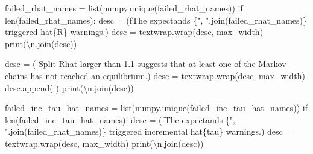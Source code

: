\documentclass[
  letterpaper,
  DIV=11,
  numbers=noendperiod]{scrartcl}
\newenvironment{Shaded}{\begin{snugshade}}{\end{snugshade}}
\newcommand{\BuiltInTok}[1]{\textcolor[rgb]{0.00,0.23,0.31}{#1}}
\newcommand{\CharTok}[1]{\textcolor[rgb]{0.13,0.47,0.30}{#1}}
\newcommand{\ControlFlowTok}[1]{\textcolor[rgb]{0.00,0.23,0.31}{#1}}
\newcommand{\NormalTok}[1]{\textcolor[rgb]{0.00,0.23,0.31}{#1}}
\newcommand{\OperatorTok}[1]{\textcolor[rgb]{0.37,0.37,0.37}{#1}}
\newcommand{\SpecialCharTok}[1]{\textcolor[rgb]{0.37,0.37,0.37}{#1}}
\newcommand{\SpecialStringTok}[1]{\textcolor[rgb]{0.13,0.47,0.30}{#1}}
\newcommand{\StringTok}[1]{\textcolor[rgb]{0.13,0.47,0.30}{#1}}
\begin{document}
\begin{Shaded}
\begin{Highlighting}[]
\NormalTok{  failed\_rhat\_names }\OperatorTok{=} \BuiltInTok{list}\NormalTok{(numpy.unique(failed\_rhat\_names))}
  \ControlFlowTok{if} \BuiltInTok{len}\NormalTok{(failed\_rhat\_names):}
\NormalTok{    desc }\OperatorTok{=}\NormalTok{ (}\SpecialStringTok{f\textquotesingle{}The expectands }\SpecialCharTok{\{}\StringTok{", "}\SpecialCharTok{.}\NormalTok{join(failed\_rhat\_names)}\SpecialCharTok{\}}\SpecialStringTok{ \textquotesingle{}}
             \StringTok{\textquotesingle{}triggered hat}\SpecialCharTok{\{R\}}\StringTok{ warnings.\textquotesingle{}}\NormalTok{)}
\NormalTok{    desc }\OperatorTok{=}\NormalTok{ textwrap.wrap(desc, max\_width)}
    \BuiltInTok{print}\NormalTok{(}\StringTok{\textquotesingle{}}\CharTok{\textbackslash{}n}\StringTok{\textquotesingle{}}\NormalTok{.join(desc))}

\NormalTok{    desc }\OperatorTok{=}\NormalTok{ (}\StringTok{\textquotesingle{}  Split Rhat larger than 1.1 suggests that at \textquotesingle{}}
            \StringTok{\textquotesingle{}least one of the Markov chains has not reached \textquotesingle{}}
            \StringTok{\textquotesingle{}an equilibrium.\textquotesingle{}}\NormalTok{)}
\NormalTok{    desc }\OperatorTok{=}\NormalTok{ textwrap.wrap(desc, max\_width)}
\NormalTok{    desc.append(}\StringTok{\textquotesingle{} \textquotesingle{}}\NormalTok{)}
    \BuiltInTok{print}\NormalTok{(}\StringTok{\textquotesingle{}}\CharTok{\textbackslash{}n}\StringTok{\textquotesingle{}}\NormalTok{.join(desc))}

\NormalTok{  failed\_inc\_tau\_hat\_names }\OperatorTok{=} \BuiltInTok{list}\NormalTok{(numpy.unique(failed\_inc\_tau\_hat\_names))}
  \ControlFlowTok{if} \BuiltInTok{len}\NormalTok{(failed\_inc\_tau\_hat\_names):}
\NormalTok{    desc }\OperatorTok{=}\NormalTok{ (}\SpecialStringTok{f\textquotesingle{}The expectands }\SpecialCharTok{\{}\StringTok{", "}\SpecialCharTok{.}\NormalTok{join(failed\_rhat\_names)}\SpecialCharTok{\}}\SpecialStringTok{ \textquotesingle{}}
             \StringTok{\textquotesingle{}triggered incremental hat}\SpecialCharTok{\{tau\}}\StringTok{ warnings.\textquotesingle{}}\NormalTok{)}
\NormalTok{    desc }\OperatorTok{=}\NormalTok{ textwrap.wrap(desc, max\_width)}
    \BuiltInTok{print}\NormalTok{(}\StringTok{\textquotesingle{}}\CharTok{\textbackslash{}n}\StringTok{\textquotesingle{}}\NormalTok{.join(desc))}


\end{Highlighting}
\end{Shaded}
\end{document}

